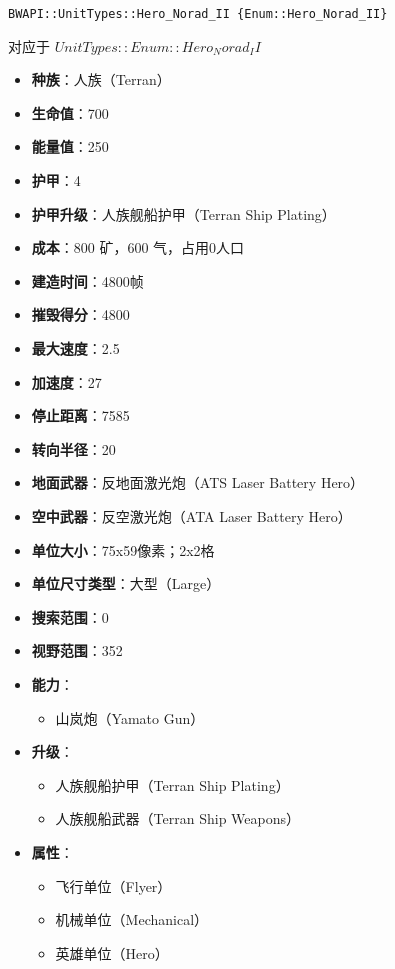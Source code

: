 \begin{tcolorbox}[colback=white, colframe=black!60!white, title=Hero\_Norad\_II(), arc=0mm]
    \begin{verbatim}
BWAPI::UnitTypes::Hero_Norad_II {Enum::Hero_Norad_II}
    \end{verbatim}
    对应于  $ UnitTypes::Enum::Hero_Norad_II $ 
    \begin{itemize}
        \item \textbf{种族}：人族（Terran）
        \item \textbf{生命值}：700
        \item \textbf{能量值}：250
        \item \textbf{护甲}：4
        \item \textbf{护甲升级}：人族舰船护甲（Terran Ship Plating）
        \item \textbf{成本}：800 矿，600 气，占用0人口
        \item \textbf{建造时间}：4800帧
        \item \textbf{摧毁得分}：4800
        \item \textbf{最大速度}：2.5
        \item \textbf{加速度}：27
        \item \textbf{停止距离}：7585
        \item \textbf{转向半径}：20
        \item \textbf{地面武器}：反地面激光炮（ATS Laser Battery Hero）
        \item \textbf{空中武器}：反空激光炮（ATA Laser Battery Hero）
        \item \textbf{单位大小}：75x59像素；2x2格
        \item \textbf{单位尺寸类型}：大型（Large）
        \item \textbf{搜索范围}：0
        \item \textbf{视野范围}：352
        \item \textbf{能力}：
            \begin{itemize}
                \item 山岚炮（Yamato Gun）
            \end{itemize}
        \item \textbf{升级}：
            \begin{itemize}
                \item 人族舰船护甲（Terran Ship Plating）
                \item 人族舰船武器（Terran Ship Weapons）
            \end{itemize}
        \item \textbf{属性}：
            \begin{itemize}
                \item 飞行单位（Flyer）
                \item 机械单位（Mechanical）
                \item 英雄单位（Hero）
            \end{itemize}
    \end{itemize}
    
\end{tcolorbox}

